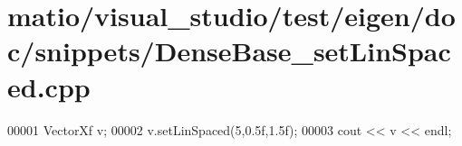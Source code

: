 \hypertarget{matio_2visual__studio_2test_2eigen_2doc_2snippets_2_dense_base__set_lin_spaced_8cpp_source}{}\section{matio/visual\+\_\+studio/test/eigen/doc/snippets/\+Dense\+Base\+\_\+set\+Lin\+Spaced.cpp}
\label{matio_2visual__studio_2test_2eigen_2doc_2snippets_2_dense_base__set_lin_spaced_8cpp_source}

\begin{DoxyCode}
00001 VectorXf v;
00002 v.setLinSpaced(5,0.5f,1.5f);
00003 cout << v << endl;
\end{DoxyCode}
